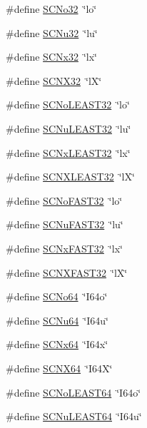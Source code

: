 \begin{DoxyCompactItemize}
\#define \hyperlink{a00113_ab561c947d62a3c7cd396d4aeef553f3c}{S\+C\+No32}~\char`\"{}lo\char`\"{}
\item 
\#define \hyperlink{a00113_abd19a83130f8d1bd2f77b765ad804f75}{S\+C\+Nu32}~\char`\"{}lu\char`\"{}
\item 
\#define \hyperlink{a00113_a4c5370556f793ac7b2c3abe896dba8e2}{S\+C\+Nx32}~\char`\"{}lx\char`\"{}
\item 
\#define \hyperlink{a00113_a50fd54ef494b4a246ada865e1de61d53}{S\+C\+N\+X32}~\char`\"{}lX\char`\"{}
\item 
\#define \hyperlink{a00113_a6b324310e03b8ecbe6888a52b7d8581d}{S\+C\+No\+L\+E\+A\+S\+T32}~\char`\"{}lo\char`\"{}
\item 
\#define \hyperlink{a00113_ae30d5cc7dbc15051e21b72229a2487f7}{S\+C\+Nu\+L\+E\+A\+S\+T32}~\char`\"{}lu\char`\"{}
\item 
\#define \hyperlink{a00113_abd82b99090a28a84541959ac7ab14ad9}{S\+C\+Nx\+L\+E\+A\+S\+T32}~\char`\"{}lx\char`\"{}
\item 
\#define \hyperlink{a00113_a756a3fd2288b4ddbcdd51f3a254c0f4e}{S\+C\+N\+X\+L\+E\+A\+S\+T32}~\char`\"{}lX\char`\"{}
\item 
\#define \hyperlink{a00113_ae40f8b90cb75998e70910e7b377288a8}{S\+C\+No\+F\+A\+S\+T32}~\char`\"{}lo\char`\"{}
\item 
\#define \hyperlink{a00113_a4ce14b7ebee0cfd5c4c935cf79a9a504}{S\+C\+Nu\+F\+A\+S\+T32}~\char`\"{}lu\char`\"{}
\item 
\#define \hyperlink{a00113_ac45f394be3c199938a85a631711ce22e}{S\+C\+Nx\+F\+A\+S\+T32}~\char`\"{}lx\char`\"{}
\item 
\#define \hyperlink{a00113_a08353b6536336d5eb4ea354af8dd30c4}{S\+C\+N\+X\+F\+A\+S\+T32}~\char`\"{}lX\char`\"{}
\item 
\#define \hyperlink{a00113_a359197f54f7db4ae57ab7c9ff4b74456}{S\+C\+No64}~\char`\"{}I64o\char`\"{}
\item 
\#define \hyperlink{a00113_af085b9f73207a4b3b4a133ab05fd7eef}{S\+C\+Nu64}~\char`\"{}I64u\char`\"{}
\item 
\#define \hyperlink{a00113_a4c454faacb996aa020efeb312379af4e}{S\+C\+Nx64}~\char`\"{}I64x\char`\"{}
\item 
\#define \hyperlink{a00113_ad57bb9b57b3afdb70185fb10af5ef140}{S\+C\+N\+X64}~\char`\"{}I64X\char`\"{}
\item 
\#define \hyperlink{a00113_a2b6b3cb28cd86580d999fa4f44f490d5}{S\+C\+No\+L\+E\+A\+S\+T64}~\char`\"{}I64o\char`\"{}
\item 
\#define \hyperlink{a00113_a239c06a67bcfc800f2d705260740e9f0}{S\+C\+Nu\+L\+E\+A\+S\+T64}~\char`\"{}I64u\char`\"{}

\end{DoxyCompactItemize}
